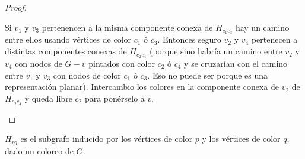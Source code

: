 \begin{proof}
\begin{enumerate}
\begin{enumerate}
        Si $v_1$ y $v_3$ pertenencen a la misma componente conexa de $H_{c_1 c_3}$ hay un camino entre ellos usando vértices de color $c_1$ ó $c_3$. Entonces seguro $v_2$ y $v_4$ pertenecen a distintas componentes conexas de $H_{c_2 c_4}$ (porque sino habría un camino entre $v_2$ y $v_4$ con nodos de $G - v$ pintados con color $c_2$ ó $c_4$ y se cruzarían con el camino entre $v_1$ y $v_3$ con nodos de color $c_1$ ó $c_3$. Eso no puede ser porque es una representación planar). Intercambio los colores en la componente conexa de $v_2$ de $H_{c_2 c_4}$ y queda libre $c_2$ para ponérselo a $v$.
        \end{enumerate}
    \end{enumerate}
\end{proof}

\begin{nota}
    $H_{pq}$ es el subgrafo inducido por los vértices de color $p$ y los vértices de color $q$, dado un coloreo de $G$.
\end{nota}

